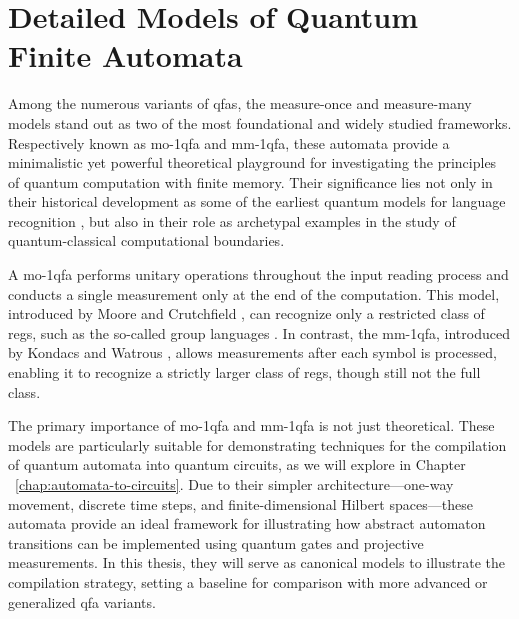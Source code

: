\section{Detailed Models of Quantum Finite Automata}
\label{sec:detailed-models}
Among the numerous variants of \glspl{qfa}, the measure-once and measure-many models stand out as two of the most foundational and widely studied frameworks. Respectively known as \gls{mo-1qfa} and \gls{mm-1qfa}, these automata provide a minimalistic yet powerful theoretical playground for investigating the principles of quantum computation with finite memory. Their significance lies not only in their historical development as some of the earliest quantum models for language recognition \cite{moore2000quantum, kondacs1997power}, but also in their role as archetypal examples in the study of quantum-classical computational boundaries.

A \gls{mo-1qfa} performs unitary operations throughout the input reading process and conducts a single measurement only at the end of the computation. This model, introduced by Moore and Crutchfield \cite{moore2000quantum}, can recognize only a restricted class of \glspl{reg}, such as the so-called group languages \cite{brodsky2002characterizations}. In contrast, the \gls{mm-1qfa}, introduced by Kondacs and Watrous \cite{kondacs1997power}, allows measurements after each symbol is processed, enabling it to recognize a strictly larger class of \glspl{reg}, though still not the full class.

The primary importance of \gls{mo-1qfa} and \gls{mm-1qfa} is not just theoretical. These models are particularly suitable for demonstrating techniques for the compilation of quantum automata into quantum circuits, as we will explore in Chapter ~\ref{chap:automata-to-circuits}. Due to their simpler architecture—one-way movement, discrete time steps, and finite-dimensional Hilbert spaces—these automata provide an ideal framework for illustrating how abstract automaton transitions can be implemented using quantum gates and projective measurements. In this thesis, they will serve as canonical models to illustrate the compilation strategy, setting a baseline for comparison with more advanced or generalized \gls{qfa} variants.



